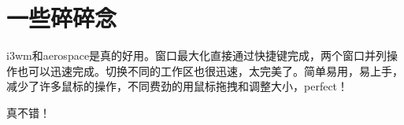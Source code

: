 \chapter{一些碎碎念}
i3wm和aerospace是真的好用。窗口最大化直接通过快捷键完成，两个窗口并列操作也可以迅速完成。切换不同的工作区也很迅速，太完美了。简单易用，易上手，减少了许多鼠标的操作，不同费劲的用鼠标拖拽和调整大小，perfect！

真不错！